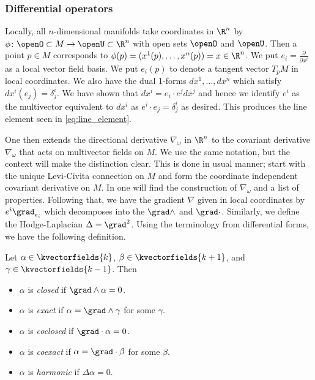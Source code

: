 \subsubsection{Differential operators}

Locally, all $n$-dimensional manifolds take coordinates in $\R^n$ by $\phi \colon \openO \subset M \to \openU \subset \R^n$ with open sets $\openO$ and $\openU$. Then a point $p\in M$ corresponds to $\phi(p)=(x^1(p),\dots,x^n(p))=x \in \R^n$. We put $e_i = \frac{\partial}{\partial x^i}$ as a local vector field basis. We put $e_i(p)$ to denote a tangent vector $T_pM$ in local coordinates.   We also have the dual 1-forms $dx^1,\dots,dx^n$ which satisfy $dx^i(e_j) = \delta^i_j$.  We have shown that $dx^i = e_i\cdot e^j dx^j$ and hence we identify $e^i$ as the multivector equivalent to $dx^i$ as $e^i \cdot e_j = \delta^i_j$ as desired. This produces the line element seen in \ref{eq:line_element}. 

One then extends the directional derivative $\nabla_\omega$ in $\R^n$ to the covariant derivative $\nabla_\omega$ that acts on multivector fields on $M$. We use the same notation, but the context will make the distinction clear. This is done in usual manner; start with the unique Levi-Civita connection on $M$ and form the coordinate independent covariant derivative on $M$. In \cite{schindler_geometric_2020} one will find the construction of $\nabla_\omega$ and a list of properties.  Following that, we have the gradient $\nabla$ given in local coordinates by $e^i \grad_{e_i}$ which decomposes into the $\grad \wedge$ and $\grad \cdot$.  Similarly, we define the Hodge-Laplacian $\Delta = \grad^2$. Using the terminology from differential forms, we have the following definition. 

\begin{definition}
Let $\alpha \in \kvectorfields{k}$, $\beta \in \kvectorfields{k+1}$, and $\gamma \in \kvectorfields{k-1}$.  Then
\begin{itemize}
    \item $\alpha$ is \emph{closed} if $\grad \wedge \alpha =0$.
    \item $\alpha$ is \emph{exact} if $\alpha = \grad \wedge \gamma$ for some $\gamma$.
    \item $\alpha$ is \emph{coclosed} if $\grad \cdot \alpha = 0$.
    \item $\alpha$ is \emph{coexact} if $\alpha = \grad \cdot \beta$ for some $\beta$.
    \item $\alpha$ is \emph{harmonic} if $\Delta \alpha =0$.
\end{itemize}
\end{definition}

